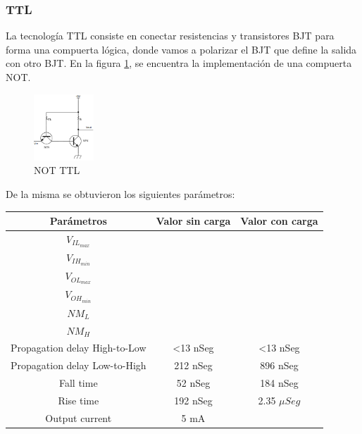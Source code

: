 \subsubsection{TTL}
La tecnología TTL consiste en conectar resistencias y transistores BJT para forma una compuerta lógica, donde vamos a polarizar el BJT que define la salida con otro BJT. En la figura \ref{fig:eje1_2}, se encuentra la implementación de una compuerta NOT.
\begin{figure}[H]
	\centering
	\includegraphics[width=0.2\textwidth]{Ejercicio1/TTL.png}
	\caption{NOT TTL}
	\label{fig:eje1_2}
\end{figure}
De la misma se obtuvieron los siguientes parámetros:
\begin{table}[H]
	\centering
	\begin{tabular}{|c|c|c|}
		\hline
		Parámetros & Valor sin carga & Valor con carga\\
		\hline
		$V_{IL_{max}}$ & & \\
		\hline
		$V_{IH_{min}}$ & & \\
		\hline
		$V_{OL_{max}}$ & & \\
		\hline
		$V_{OH_{min}}$ & & \\
		\hline
		$NM_{L}$ & & \\
		\hline
		$NM_{H}$ & & \\
		\hline
		Propagation delay High-to-Low & <13 nSeg & <13 nSeg\\
		\hline
		Propagation delay Low-to-High & 212 nSeg & 896 nSeg\\
		\hline
		Fall time & 52 nSeg & 184 nSeg\\
		\hline
		Rise time & 192 nSeg & 2.35 $\mu Seg$\\
		\hline
		Output current & 5 mA & \\
		\hline
	\end{tabular}
\end{table}

